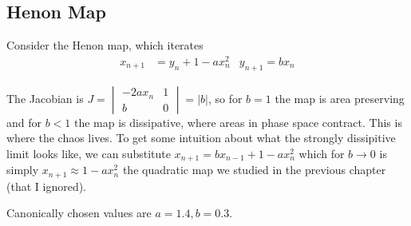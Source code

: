 \documentclass[10pt]{article}
\begin{document}
\subsection{Henon Map}

Consider the Henon map, which iterates
\begin{align}
    x_{n+1} &= y_n + 1 - ax_n^2 & y_{n+1} = bx_n
\end{align}

The Jacobian is $J =
\begin{vmatrix}
    -2ax_n & 1\\
    b & 0
\end{vmatrix} = |b|$, so for $b=1$ the map is area preserving and for $b < 1$ the map is dissipative, where areas in phase space contract. This is where the chaos lives. To get some intuition about what the strongly dissipitive limit looks like, we can substitute $x_{n+1} = bx_{n-1} + 1 - ax_n^2$ which for $b \to 0$ is simply $x_{n+1} \approx 1 - ax_n^2$ the quadratic map we studied in the previous chapter (that I ignored).

Canonically chosen values are $a = 1.4, b = 0.3$.
\end{document}
